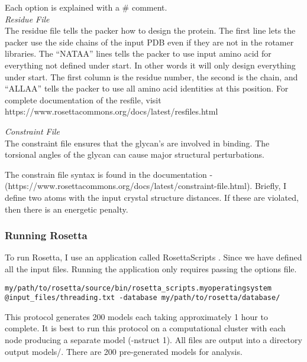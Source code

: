 
Each option is explained with a \# comment.\\

\textit{Residue File}\\
The residue file tells the packer how to design the protein. The first line lets the packer use the side chains of the input PDB even if they are not in the rotamer libraries. The ``NATAA'' lines tells the packer to use input amino acid for everything not defined under start. In other words it will only design everything under start. The first column is the residue number, the second is the chain, and ``ALLAA'' tells the packer to use all amino acid identities at this position. For complete documentation of the resfile, visit https://www.rosettacommons.org/docs/latest/resfiles.html



\textit{Constraint File} \\
The constraint file ensures that the glycan's are involved in binding. The torsional angles of the glycan can cause major structural perturbations.


The constrain file syntax is found in the documentation - \\(https://www.rosettacommons.org/docs/latest/constraint-file.html). Briefly, I define two atoms with the input crystal structure distances. If these are violated, then there is an energetic penalty. \\

\subsubsection{Running Rosetta}
To run Rosetta, I use an application called RosettaScripts \citep{Fleishman:2011ji}. Since we have defined all the input files. Running the application only requires passing the options file.

\begin{lstlisting}[breaklines=true]
my/path/to/rosetta/source/bin/rosetta_scripts.myoperatingsystem @input_files/threading.txt -database my/path/to/rosetta/database/
\end{lstlisting}

This protocol generates 200 models each taking approximately 1 hour to complete. It is best to run this protocol on a computational cluster with each node producing a separate model (-nstruct 1). All files are output into a directory output models/. There are 200 pre-generated models for analysis. \\

